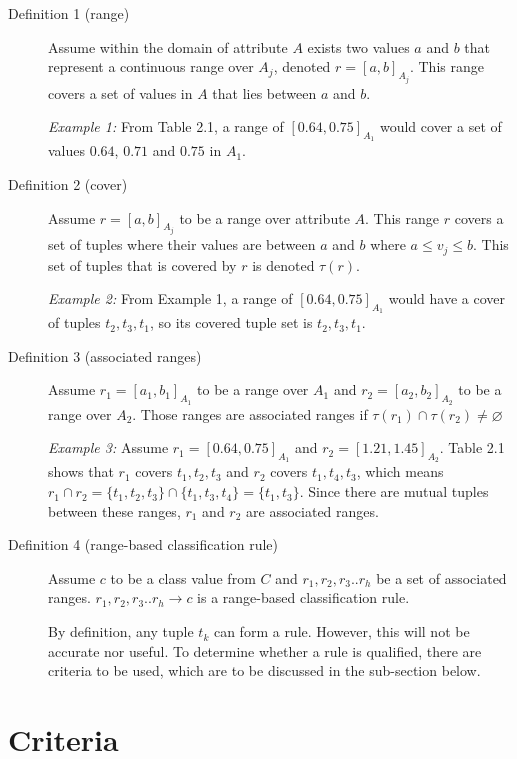 \begin{description}

\item[Definition 1 (range)]
Assume within the domain of attribute $A$ exists two values $a$ and $b$ that represent a continuous range over $A_j$, denoted $r = [a,b]_{A_j}$. This range covers a set of values in $A$ that lies between $a$ and $b$. 

\textit{Example 1:} From Table 2.1, a range of $[0.64, 0.75]_{A_1}$ would cover a set of values $0.64$, $0.71$ and $0.75$ in $A_1$.

\item[Definition 2 (cover)]
Assume $r = [a,b]_{A_j}$ to be a range over attribute $A$. This range $r$ covers a set of tuples where their values are between $a$ and $b$ where $a \leq v_j \leq b$. This set of tuples that is covered by $r$ is denoted $\tau(r)$. 

\textit{Example 2:} From Example 1, a range of $[0.64, 0.75]_{A_1}$ would have a cover of tuples $t_2, t_3, t_1$, so its covered tuple set is $t_2, t_3, t_1$.

\item[Definition 3 (associated ranges)]
Assume $r_1 = [a_1,b_1]_{A_1}$ to be a range over $A_1$ and $r_2 = [a_2,b_2]_{A_2}$ to be a range over $A_2$. Those ranges are associated ranges if $\tau(r_1) \cap \tau(r_2) \neq \varnothing$ 

\textit{Example 3:} Assume $r_1 = [0.64, 0.75]_{A_1}$ and $r_2 = [1.21, 1.45]_{A_2}$. Table 2.1 shows that $r_1$ covers $t_1, t_2, t_3$ and $r_2$ covers $t_1, t_4, t_3$, which means $r_1 \cap r_2 = \{t_1, t_2, t_3\} \cap \{t_1, t_3, t_4\} = \{t_1, t_3\}$. Since there are mutual tuples between these ranges, $r_1$ and $r_2$ are associated ranges. 

\item[Definition 4 (range-based classification rule)]
Assume $c$ to be a class value from $C$ and $r_1, r_2, r_3..r_h$ be a set of  associated ranges. $r_1, r_2, r_3..r_h \rightarrow c$ is a range-based classification rule. 

By definition, any tuple $t_k$ can form a rule. However, this will not be accurate nor useful. To determine whether a rule is qualified, there are criteria to be used, which are to be discussed in the sub-section below.

\end{description}

\section{Criteria}

